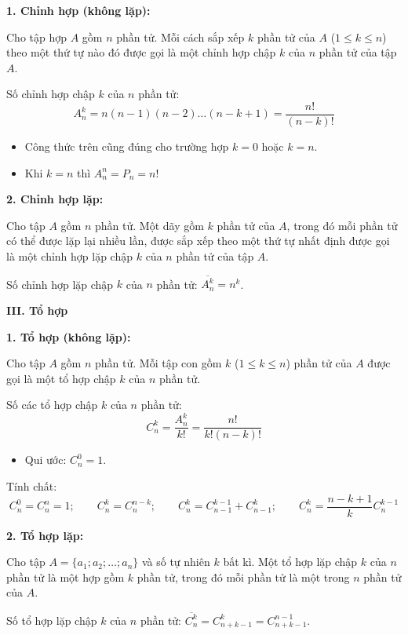 \textbf{1. Chỉnh hợp (không lặp):}

Cho tập hợp $A$ gồm $n$ phần tử. Mỗi cách sắp xếp $k$ phần tử của $A$ ($1\le k\le n$) theo một thứ tự nào đó được gọi là một chỉnh hợp chập $k$ của $n$ phần tử của tập $A$.

Số chỉnh hợp chập $k$ của $n$ phần tử:
\[A_n^k=n(n-1)(n-2)\ldots(n-k+1)=\dfrac{n!}{(n-k)!}\]
\begin{itemize}
	\item Công thức trên cũng đúng cho trường hợp $k=0$ hoặc $k=n$.
	\item Khi $k=n$ thì $A_n^n=P_n=n!$
\end{itemize}

\textbf{2. Chỉnh hợp lặp:}

Cho tập $A$ gồm $n$ phần tử. Một dãy gồm $k$ phần tử của $A$, trong đó mỗi phần tử có thể được lặp lại nhiều lần, được sắp xếp theo một thứ tự nhất định được gọi là một chỉnh hợp lặp chập $k$ của $n$ phần tử của tập $A$.

Số chỉnh hợp lặp chập $k$ của $n$ phần tử: $\overline{A_n^k}=n^k$.

\textbf{III. Tổ hợp}

\textbf{1. Tổ hợp (không lặp):}

Cho tập $A$ gồm $n$ phần tử. Mỗi tập con gồm $k$ ($1\le k\le n$) phần tử của $A$ được gọi là một tổ hợp chập $k$ của $n$ phần tử.

Số các tổ hợp chập $k$ của $n$ phần tử:
\[C_n^k=\dfrac{A_n^k}{k!}=\dfrac{n!}{k!(n-k)!}\]
\begin{itemize}
	\item Qui ước: $C_n^0=1$.
\end{itemize}
Tính chất:
\[C_n^0=C_n^n=1;\qquad C_n^k=C_n^{n-k};\qquad C_n^k=C_{n-1}^{k-1}+C_{n-1}^k;\qquad C_n^k=\dfrac{n-k+1}{k}C_n^{k-1}\]

\textbf{2. Tổ hợp lặp:}

Cho tập $A=\{a_1;a_2;\ldots;a_n\}$ và số tự nhiên $k$ bất kì. Một tổ hợp lặp chập $k$ của $n$ phần tử là một hợp gồm $k$ phần tử, trong đó mỗi phần tử là một trong $n$ phần tử của $A$.

Số tổ hợp lặp chập $k$ của $n$ phần tử: $\overline{C_n^k}=C_{n+k-1}^k=C_{n+k-1}^{n-1}$.

